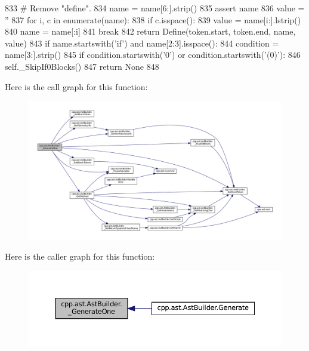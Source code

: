 \begin{DoxyCode}
833                 \textcolor{comment}{# Remove "define".}
834                 name = name[6:].strip()
835                 \textcolor{keyword}{assert} name
836                 value = \textcolor{stringliteral}{''}
837                 \textcolor{keywordflow}{for} i, c \textcolor{keywordflow}{in} enumerate(name):
838                     \textcolor{keywordflow}{if} c.isspace():
839                         value = name[i:].lstrip()
840                         name = name[:i]
841                         \textcolor{keywordflow}{break}
842                 \textcolor{keywordflow}{return} Define(token.start, token.end, name, value)
843             \textcolor{keywordflow}{if} name.startswith(\textcolor{stringliteral}{'if'}) \textcolor{keywordflow}{and} name[2:3].isspace():
844                 condition = name[3:].strip()
845                 \textcolor{keywordflow}{if} condition.startswith(\textcolor{stringliteral}{'0'}) \textcolor{keywordflow}{or} condition.startswith(\textcolor{stringliteral}{'(0)'}):
846                     self.\_SkipIf0Blocks()
847         \textcolor{keywordflow}{return} \textcolor{keywordtype}{None}
848 
\end{DoxyCode}
Here is the call graph for this function\+:
\nopagebreak
\begin{figure}[H]
\begin{center}
\leavevmode
\includegraphics[width=350pt]{classcpp_1_1ast_1_1AstBuilder_ae3a006851c8f8a4b5929e5e8bcbd4618_cgraph}
\end{center}
\end{figure}
Here is the caller graph for this function\+:
\nopagebreak
\begin{figure}[H]
\begin{center}
\leavevmode
\includegraphics[width=350pt]{classcpp_1_1ast_1_1AstBuilder_ae3a006851c8f8a4b5929e5e8bcbd4618_icgraph}
\end{center}
\end{figure}
